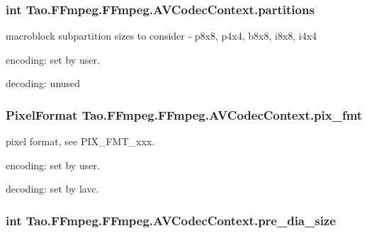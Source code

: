 \label{struct_tao_1_1_f_fmpeg_1_1_f_fmpeg_1_1_a_v_codec_context_abcb480adf398e4ecec0336c4d9328eb3}
\hypertarget{struct_tao_1_1_f_fmpeg_1_1_f_fmpeg_1_1_a_v_codec_context_a42f02bd6d00f776c33cc563464c1723d}{
\subsubsection[{partitions}]{\setlength{\rightskip}{0pt plus 5cm}int {\bf Tao.FFmpeg.FFmpeg.AVCodecContext.partitions}}}
\label{struct_tao_1_1_f_fmpeg_1_1_f_fmpeg_1_1_a_v_codec_context_a42f02bd6d00f776c33cc563464c1723d}
macroblock subpartition sizes to consider -\/ p8x8, p4x4, b8x8, i8x8, i4x4
\begin{DoxyItemize}
\item encoding: set by user.
\item decoding: unused 
\end{DoxyItemize}\hypertarget{struct_tao_1_1_f_fmpeg_1_1_f_fmpeg_1_1_a_v_codec_context_a7927d1fe4aef73b7925665a8626abd4c}{
\subsubsection[{pix\_\-fmt}]{\setlength{\rightskip}{0pt plus 5cm}PixelFormat {\bf Tao.FFmpeg.FFmpeg.AVCodecContext.pix\_\-fmt}}}
\label{struct_tao_1_1_f_fmpeg_1_1_f_fmpeg_1_1_a_v_codec_context_a7927d1fe4aef73b7925665a8626abd4c}
pixel format, see PIX\_\-FMT\_\-xxx.
\begin{DoxyItemize}
\item encoding: set by user.
\item decoding: set by lavc. 
\end{DoxyItemize}\hypertarget{struct_tao_1_1_f_fmpeg_1_1_f_fmpeg_1_1_a_v_codec_context_a19b5a2c34c4965c984a46922e046e80a}{
\subsubsection[{pre\_\-dia\_\-size}]{\setlength{\rightskip}{0pt plus 5cm}int {\bf Tao.FFmpeg.FFmpeg.AVCodecContext.pre\_\-dia\_\-size}}}
